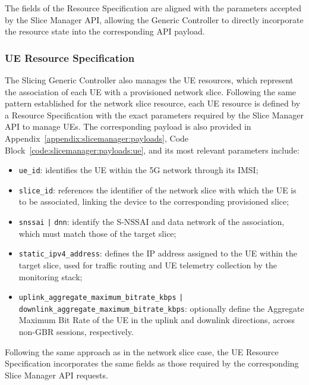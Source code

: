 The fields of the Resource Specification are aligned with the parameters accepted by the Slice Manager \acs{API}, allowing the Generic Controller to directly incorporate the resource state into the corresponding \acs{API} payload.

\subsubsection{\acl{UE} Resource Specification}

The Slicing Generic Controller also manages the \acs{UE} resources, which represent the association of each \acs{UE} with a provisioned network slice. Following the same pattern established for the network slice resource, each \acs{UE} resource is defined by a Resource Specification with the exact parameters required by the Slice Manager \acs{API} to manage \acsp{UE}. The corresponding payload is also provided in Appendix~\ref{appendix:slicemanager:payloads}, Code Block~\ref{code:slicemanager:payloads:ue}, and its most relevant parameters include:

{\setlength{\emergencystretch}{3em}%
\begin{itemize}
    \item \texttt{ue\_id}: identifies the \acs{UE} within the \acs{5G} network through its \acf{IMSI};
    \item \texttt{slice\_id}: references the identifier of the network slice with which the \acs{UE} is to be associated, linking the device to the corresponding provisioned slice;
    \item \texttt{snssai} \texttt{|} \texttt{dnn}: identify the \acs{S-NSSAI} and data network of the association, which must match those of the target slice;
    \item \texttt{static\allowbreak\_ipv4\allowbreak\_address}: defines the \acs{IP} address assigned to the \acs{UE} within the target slice, used for traffic routing and \acs{UE} telemetry collection by the monitoring stack;
    \item \texttt{uplink\allowbreak\_aggregate\allowbreak\_maximum\allowbreak\_bitrate\allowbreak\_kbps} \texttt{|} \texttt{downlink\allowbreak\_aggregate\allowbreak\_maximum\allowbreak\_bitrate\allowbreak\_kbps}: optionally define the Aggregate Maximum Bit Rate of the \acs{UE} in the uplink and downlink directions, across non-\acs{GBR} sessions, respectively.
\end{itemize}\par}

Following the same approach as in the network slice case, the \acs{UE} Resource Specification incorporates the same fields as those required by the corresponding Slice Manager \acs{API} requests.

